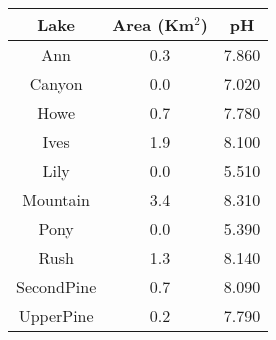\begin{table}[ht]
\centering
\begin{tabular}{ccc}
  \hline
\hline
  Lake & Area (Km$^2$)  & pH \\
 \hline
Ann & 0.3 & 7.860 \\ 
  Canyon & 0.0 & 7.020 \\ 
  Howe & 0.7 & 7.780 \\ 
  Ives & 1.9 & 8.100 \\ 
  Lily & 0.0 & 5.510 \\ 
  Mountain & 3.4 & 8.310 \\ 
  Pony & 0.0 & 5.390 \\ 
  Rush & 1.3 & 8.140 \\ 
  SecondPine & 0.7 & 8.090 \\ 
  UpperPine & 0.2 & 7.790 \\ 
   \hline
\end{tabular}
\end{table}
